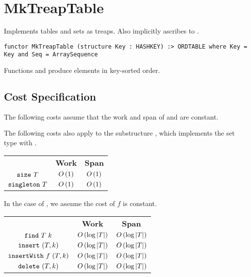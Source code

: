 \chapter{MkTreapTable}
\label{ch:treap-table}
\begin{preamble}
Implements tables and sets as treaps. Also implicitly ascribes to .
\begin{verbatim}
functor MkTreapTable (structure Key : HASHKEY) :> ORDTABLE where Key = Key and Seq = ArraySequence
\end{verbatim}
\end{preamble}

\begin{gram}
Functions  and  produce elements in key-sorted order.
\end{gram}

\section{Cost Specification}

\begin{gram}
The following costs assume that the work and span of 
and  are constant.
\end{gram}

\begin{gram}
The following costs also apply to the substructure , which implements
the set type with .
\end{gram}

\begin{costspec}
\begin{tabular}{c|c|c}
& \textbf{Work} & \textbf{Span} \\
$\texttt{size}~T$ & $O\left({1}\right)$ & $O\left({1}\right)$ \\
$\texttt{singleton}~T$ & $O\left({1}\right)$ & $O\left({1}\right)$ \\
\end{tabular}
\end{costspec}

\begin{costspec}
In the case of , we assume the cost of $f$ is constant.
\begin{tabular}{c|c|c}
& \textbf{Work} & \textbf{Span} \\
$\texttt{find}~T~k$ & $O\left({\log|T|}\right)$ & $O\left({\log|T|}\right)$ \\
$\texttt{insert}~(T, k)$ & $O\left({\log|T|}\right)$ & $O\left({\log|T|}\right)$ \\
$\texttt{insertWith}~f~(T, k)$ & $O\left({\log|T|}\right)$ & $O\left({\log|T|}\right)$ \\
$\texttt{delete}~(T, k)$ & $O\left({\log|T|}\right)$ & $O\left({\log|T|}\right)$
\end{tabular}
\end{costspec}

